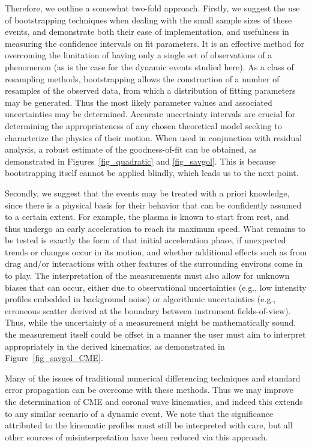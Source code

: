 \documentclass[structabstract]{aa}
\begin{document}
Therefore, we outline a somewhat two-fold approach. Firstly, we suggest the use of bootstrapping techniques when dealing with the small sample sizes of these events, and demonstrate both their ease of implementation, and usefulness in measuring the confidence intervals on fit parameters. It is an effective method for overcoming the limitation of having only a single set of observations of a phenomenon (as is the case for the dynamic events studied here). As a class of resampling methods, bootstrapping allows the construction of a number of resamples of the observed data, from which a distribution of fitting parameters may be generated. Thus the most likely parameter values and associated uncertainties may be determined. Accurate uncertainty intervals are crucial for determining the appropriateness of any chosen theoretical model seeking to characterize the physics of their motion. When used in conjunction with residual analysis, a robust estimate of the goodness-of-fit can be obtained, as demonstrated in Figures~\ref{fig_quadratic} and \ref{fig_savgol}. This is because bootstrapping itself cannot be applied blindly, which leads us to the next point.

Secondly, we suggest that the events may be treated with a priori knowledge, since there is a physical basis for their behavior that can be confidently assumed to a certain extent. For example, the plasma is known to start from rest, and thus undergo an early acceleration to reach its maximum speed. What remains to be tested is exactly the form of that initial acceleration phase, if unexpected trends or changes occur in its motion, and whether additional effects such as from drag and/or interactions with other features of the surrounding environs come in to play. The interpretation of the measurements must also allow for unknown biases that can occur, either due to observational uncertainties (e.g., low intensity profiles embedded in background noise) or algorithmic uncertainties (e.g., erroneous scatter derived at the boundary between instrument fields-of-view). Thus, while the uncertainty of a measurement might be mathematically sound, the measurement itself could be offset in a manner the user must aim to interpret appropriately in the derived kinematics, as demonstrated in Figure~\ref{fig_savgol_CME}.

Many of the issues of traditional numerical differencing techniques and standard error propagation can be overcome with these methods. Thus we may improve the determination of CME and coronal wave kinematics, and indeed this extends to any similar scenario of a dynamic event. We note that the significance attributed to the kinematic profiles must still be interpreted with care, but all other sources of misinterpretation have been reduced via this approach.
\end{document}
